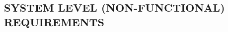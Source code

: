 \documentclass[letterpaper, 10pt, draftclsnofoot, onecolumn]{IEEEtran}
\begin{document}
{\begin{comment}
{\selectlanguage{english}\color{black}
[ insert your text here ]}

\subsection[ASSUMPTIONS AND
DEPENDENCIES]{\selectlanguage{english}\rmfamily\bfseries\color{black}
ASSUMPTIONS AND DEPENDENCIES}
{\selectlanguage{english}\itshape\color{black}
This subsection of the document should list each of the factors that
affect the requirements stated in the document. \ These factors are not
design constraints on the system and/or software but are, rather, any
changes to them that can affect the requirements in the document. For
example, an assumption may be that a speci[FB01?]c operating system
will be available on the hardware designated for the software product.
\ If, in fact, the operating system is not available, the document
would then have to change accordingly.}

{\selectlanguage{english}\color{black}
[ insert your text here ]}

\end{comment}



\subsection[SYSTEM LEVEL (NON{}-FUNCTIONAL)
REQUIREMENTS]{\rmfamily\bfseries\color{black}
SYSTEM LEVEL (NON-FUNCTIONAL) REQUIREMENTS}


\begin{comment}



{\selectlanguage{english}\itshape\color{black}

This subsection of the document should identify system level (whole, not
functional) requirements that impact the construction, operation,
packaging and delivery of the system and software.}





\end{comment}}
\end{document}
